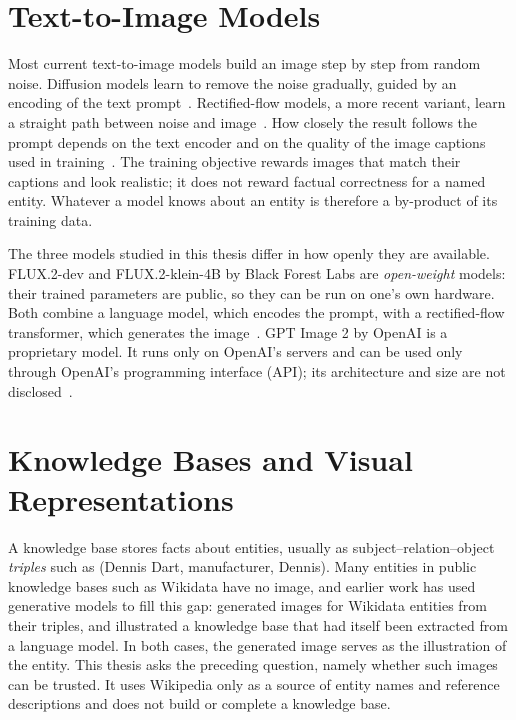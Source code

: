 \section{Text-to-Image Models}
\label{sec:t2i-models}

Most current text-to-image models build an image step by step from random
noise. Diffusion models learn to remove the noise gradually, guided by an
encoding of the text prompt~\citep{rombach2022,podell2024}. Rectified-flow
models, a more recent variant, learn a straight path between noise and
image~\citep{esser2024}. How closely the result follows the prompt depends on
the text encoder and on the quality of the image captions used in
training~\citep{betker2023}. The training objective rewards images that match
their captions and look realistic; it does not reward factual correctness for
a named entity. Whatever a model knows about an entity is therefore a
by-product of its training data.

The three models studied in this thesis differ in how openly they are
available. FLUX.2-dev and FLUX.2-klein-4B by Black Forest Labs are
\emph{open-weight} models: their trained parameters are public, so they can be
run on one's own hardware. Both combine a language model, which encodes the
prompt, with a rectified-flow transformer, which generates the
image~\citep{flux2,flux2klein}. GPT Image 2 by OpenAI is a proprietary model.
It runs only on OpenAI's servers and can be used only through OpenAI's
programming interface (API); its architecture and size are not
disclosed~\citep{gptimage2}.


\section{Knowledge Bases and Visual Representations}
\label{sec:kb-illustration}

A knowledge base stores facts about entities, usually as
subject--relation--object \emph{triples} such as (Dennis Dart, manufacturer,
Dennis). Many entities in public knowledge bases such as Wikidata have no
image, and earlier work has used generative models to fill this gap:
\citet{abuahmad2023} generated images for Wikidata entities from their triples,
and \citet{brinster2025} illustrated a knowledge base that had itself been
extracted from a language model. In both cases, the generated image serves as
the illustration of the entity. This thesis asks the preceding question,
namely whether such images can be trusted. It uses Wikipedia only as a source
of entity names and reference descriptions and does not build or complete a
knowledge base.


